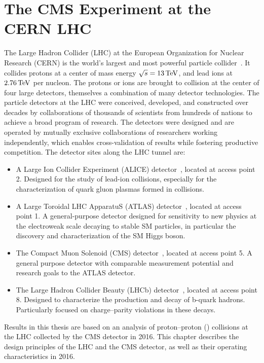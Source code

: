 \chapter{The CMS Experiment at the CERN LHC}

The Large Hadron Collider (LHC) at the European Organization for Nuclear Research (CERN)
is the world's largest and most powerful particle collider~\cite{Evans:2008zzb}. It collides protons 
at a center of mass energy $\sqrt{s} = 13\,\text{Te\hspace{-.08em}V}$, and lead ions at $2.76\,\text{Te\hspace{-.08em}V}$ per nucleon.
The protons or ions are brought to collision at the center of four large detectors,
themselves a combination of many detector technologies. 
The particle detectors at the LHC were conceived, developed, and constructed over decades
by collaborations of thousands of scientists from hundreds of nations to
achieve a broad program of research. The detectors were designed and are operated
by mutually exclusive collaborations of researchers working independently,
which enables cross-validation of results while fostering productive competition.
The detector sites along the LHC tunnel are:

\begin{itemize}
  \item A Large Ion Collider Experiment (ALICE) detector~\cite{Aamodt:2008zz}, located at access point 2.
  Designed for the study of lead-ion collisions, especially for the characterization
    of quark gluon plasmas formed in collisions.
  \item A Large Toroidal LHC ApparatuS (ATLAS) detector~\cite{Aad:2008zzm}, located at access point 1.
  A general-purpose detector designed for sensitivity to new physics at the electroweak scale
  decaying to stable SM particles, in particular the 
    discovery and characterization of the SM Higgs boson.
  \item The Compact Muon Solenoid (CMS) detector~\cite{Chatrchyan:2008aa}, located at access point 5.
    A general purpose detector with comparable measurement potential 
    and research goals to the ATLAS detector.
  \item The Large Hadron Collider Beauty (LHCb) detector~\cite{Alves:2008zz}, located at access point 8.
  Designed to characterize the production and decay of b-quark hadrons. Particularly
    focused on charge--parity violations in these decays.
\end{itemize}

Results in this thesis are based on an analysis of proton--proton (\pp) collisions at the LHC 
collected by the CMS detector in 2016. This chapter describes the design principles of the 
LHC and the CMS detector, as well as their operating characteristics in 2016.
  
